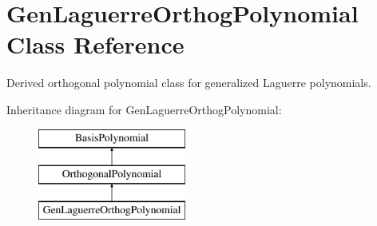 \section{Gen\+Laguerre\+Orthog\+Polynomial Class Reference}
\label{classPecos_1_1GenLaguerreOrthogPolynomial}


Derived orthogonal polynomial class for generalized Laguerre polynomials.  


Inheritance diagram for Gen\+Laguerre\+Orthog\+Polynomial\+:\begin{figure}[H]
\begin{center}
\leavevmode
\includegraphics[height=3.000000cm]{classPecos_1_1GenLaguerreOrthogPolynomial}
\end{center}
\end{figure}
